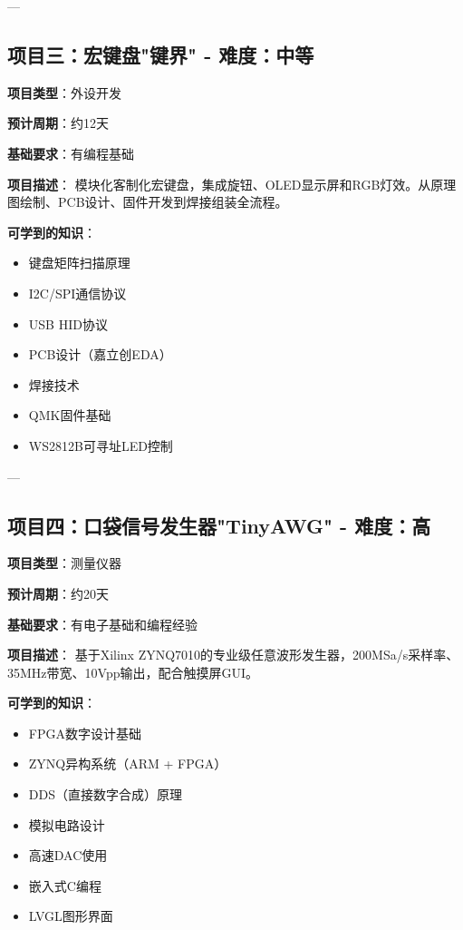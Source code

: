 \documentclass[12pt,a4paper]{article}
\begin{document}
---

\subsection{项目三：宏键盘"键界" - 难度：中等}

\textbf{项目类型}：外设开发

\textbf{预计周期}：约12天

\textbf{基础要求}：有编程基础

\textbf{项目描述}：
模块化客制化宏键盘，集成旋钮、OLED显示屏和RGB灯效。从原理图绘制、PCB设计、固件开发到焊接组装全流程。

\textbf{可学到的知识}：
\begin{itemize}
    \item 键盘矩阵扫描原理
    \item I2C/SPI通信协议
    \item USB HID协议
    \item PCB设计（嘉立创EDA）
    \item 焊接技术
    \item QMK固件基础
    \item WS2812B可寻址LED控制
\end{itemize}

---

\subsection{项目四：口袋信号发生器"TinyAWG" - 难度：高}

\textbf{项目类型}：测量仪器

\textbf{预计周期}：约20天

\textbf{基础要求}：有电子基础和编程经验

\textbf{项目描述}：
基于Xilinx ZYNQ7010的专业级任意波形发生器，200MSa/s采样率、35MHz带宽、10Vpp输出，配合触摸屏GUI。

\textbf{可学到的知识}：
\begin{itemize}
    \item FPGA数字设计基础
    \item ZYNQ异构系统（ARM + FPGA）
    \item DDS（直接数字合成）原理
    \item 模拟电路设计
    \item 高速DAC使用
    \item 嵌入式C编程
    \item LVGL图形界面
\end{itemize}
\end{document}
